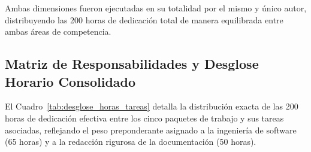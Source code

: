 Ambas dimensiones fueron ejecutadas en su totalidad por el mismo y único autor, distribuyendo las 200 horas de dedicación total de manera equilibrada entre ambas áreas de competencia.

\subsection{Matriz de Responsabilidades y Desglose Horario Consolidado}
\label{subsec:desglose_horario_tabla}

El Cuadro~\ref{tab:desglose_horas_tareas} detalla la distribución exacta de las 200 horas de dedicación efectiva entre los cinco paquetes de trabajo y sus tareas asociadas, reflejando el peso preponderante asignado a la ingeniería de software (65 horas) y a la redacción rigurosa de la documentación (50 horas).

